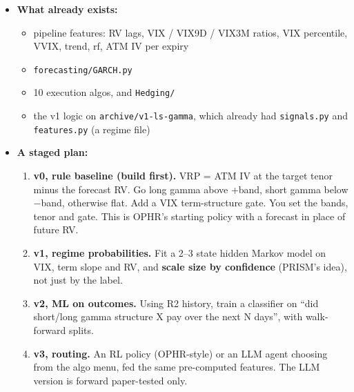 \documentclass{article}
\begin{document}
\begin{itemize}

\item \textbf{What already exists:}

\begin{itemize}

\item pipeline features: RV lags, VIX /\allowbreak{} VIX9D /\allowbreak{} VIX3M ratios, VIX percentile, VVIX, trend, rf, ATM IV per expiry

\item \texttt{forecasting/\allowbreak{}GARCH.\allowbreak{}py}

\item 10 execution algos, and \texttt{Hedging/\allowbreak{}}

\item the v1 logic on \texttt{archive/\allowbreak{}v1-\allowbreak{}ls-\allowbreak{}gamma}, which already had \texttt{signals.\allowbreak{}py} and \texttt{features.\allowbreak{}py} (a regime file)

\end{itemize}

\item \textbf{A staged plan:}

\begin{enumerate}

\item \textbf{v0, rule baseline (build first).} VRP = ATM IV at the target tenor minus the forecast RV. Go long gamma above +band, short gamma below \ensuremath{-}band, otherwise flat. Add a VIX term-structure gate. You set the bands, tenor and gate. This is OPHR's starting policy with a forecast in place of future RV.

\item \textbf{v1, regime probabilities.} Fit a 2--3 state hidden Markov model on VIX, term slope and RV, and \textbf{scale size by confidence} (PRISM's idea), not just by the label.

\item \textbf{v2, ML on outcomes.} Using R2 history, train a classifier on ``did short/\allowbreak{}long gamma structure X pay over the next N days'', with walk-forward splits.

\item \textbf{v3, routing.} An RL policy (OPHR-style) or an LLM agent choosing from the algo menu, fed the same pre-computed features. The LLM version is forward paper-tested only.

\end{enumerate}


\end{itemize}
\end{document}
